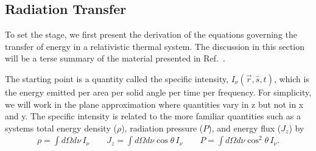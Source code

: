 \documentclass[superscriptaddress,groupedaddress,nofootnoteinbib,11pt]{article}
\newcommand\eea{\end{eqnarray}}
\newcommand\bea{\begin{eqnarray}}
\begin{document}
\subsection{Radiation Transfer}\label{Sec: radtrans}

To set the stage, we first present the derivation of the equations governing the transfer of energy in a relativistic thermal system.  The discussion in this section will be a terse summary of the material presented in Ref.~\cite{Rybicki:2004hfl}.  

The starting point is a quantity called the specific intensity, $I_\nu(\vec r, \hat s , t)$, which is the energy emitted per area per solid angle per time per frequency.  For simplicity, we will work in the plane approximation where quantities vary in z but not in x and y.  
The specific intensity is related to the more familiar quantities such as a systems total energy density ($\rho$), radiation pressure ($P$), and energy flux ($J_z$) by
\bea
\rho = \int d\Omega d\nu \, I_\nu \qquad 
J_z = \int d\Omega d\nu \cos \theta \, I_\nu \qquad 
P = \int d\Omega d\nu \cos^2 \theta \, I_\nu. \nonumber 
\eea
\end{document}
